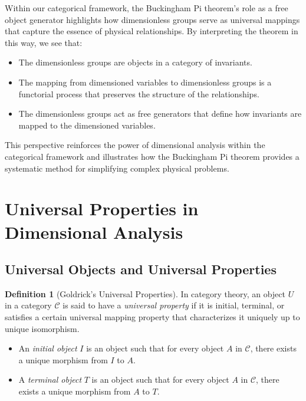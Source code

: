 \documentclass{article}
\theoremstyle{definition}
\newtheorem{definition}{Definition}[section]
\theoremstyle{remark}
\begin{document}
	Within our categorical framework, the Buckingham Pi theorem's role as a free object generator highlights how dimensionless groups serve as universal mappings that capture the essence of physical relationships. By interpreting the theorem in this way, we see that:
	
	\begin{itemize}
		\item The dimensionless groups are objects in a category of invariants.
		\item The mapping from dimensioned variables to dimensionless groups is a functorial process that preserves the structure of the relationships.
		\item The dimensionless groups act as free generators that define how invariants are mapped to the dimensioned variables.
	\end{itemize}
	
	This perspective reinforces the power of dimensional analysis within the categorical framework and illustrates how the Buckingham Pi theorem provides a systematic method for simplifying complex physical problems.
	
	\section{Universal Properties in Dimensional Analysis}
	
	\subsection{Universal Objects and Universal Properties}
	
	\begin{definition}[Goldrick's Universal Properties]
		In category theory, an object $U$ in a category $\mathcal{C}$ is said to have a \emph{universal property} if it is initial, terminal, or satisfies a certain universal mapping property that characterizes it uniquely up to unique isomorphism.
		
		\begin{itemize}
			\item An \emph{initial object} $I$ is an object such that for every object $A$ in $\mathcal{C}$, there exists a unique morphism from $I$ to $A$.
			\item A \emph{terminal object} $T$ is an object such that for every object $A$ in $\mathcal{C}$, there exists a unique morphism from $A$ to $T$.
		\end{itemize}
	\end{definition}
	
\end{document}
